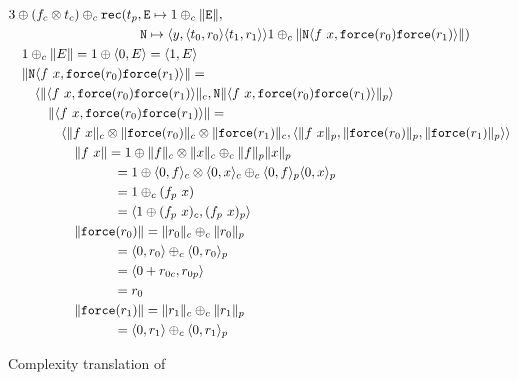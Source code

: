 \begin{figure}
  \label{fig:ws_treemap_complexity_translation}
  \caption{Complexity translation of }
  \begin{equation*}
    \begin{split}
      &3 \oplus (f_c \otimes t_c) \oplus_c \T{rec}(t_p, \T{E} \mapsto 1 \oplus_c \|\T{E}\|, \\
      &\quadten \T{N} \mapsto \langle y, \langle t_0, r_0 \rangle \langle t_1, r_1 \rangle \rangle 1 \oplus_c \|\T{N}\langle f\ x, \T{force}(r_0) \T{force}(r_1)\rangle \| ) \\
      &\quad 1 \oplus_c \|E\| = 1 \oplus \langle 0, E \rangle = \langle 1, E \rangle \\
      &\quad \|\T{N}\langle f\ x, \T{force}(r_0) \T{force}(r_1)\rangle \| = \\
      &\qquad \langle \|\langle f\ x, \T{force}(r_0) \T{force}(r_1)\rangle \|_c, \T{N} \|\langle f\ x, \T{force}(r_0) \T{force}(r_1)\rangle\|_p\rangle \\
      &\quadthree \|\langle f\ x, \T{force}(r_0) \T{force}(r_1)\rangle \| = \\
      &\quadfour \langle \|f\ x\|_c \otimes \|\T{force}(r_0)\|_c \otimes \|\T{force}(r_1)\|_c, \langle \|f\ x\|_p, \|\T{force}(r_0)\|_p, \|\T{force}(r_1)\|_p \rangle \rangle \\
      &\quadfive  \|f\ x\| = 1 \oplus \|f\|_c \otimes \|x\|_c \oplus_c \|f\|_p \|x\|_p \\
      &\quadeight = 1 \oplus \langle 0, f \rangle_c \otimes \langle 0, x \rangle_c \oplus_c \langle 0, f \rangle_p \langle 0, x \rangle_p \\
      &\quadeight = 1 \oplus_c (f_p\ x) \\
      &\quadeight = \langle 1 \oplus (f_p\ x)_c, (f_p\ x)_p \rangle \\
      &\quadfive \|\T{force}(r_0)\| = \|r_0\|_c \oplus_c \|r_0\|_p \\
      &\quadeight = \langle 0, r_0 \rangle \oplus_c \langle 0, r_0 \rangle_p \\
      &\quadeight = \langle 0 + r_{0c}, r_{0p} \rangle \\
      &\quadeight = r_0 \\
      &\quadfive \|\T{force}(r_1)\| = \|r_1\|_c \oplus_c \|r_1\|_p \\
      &\quadeight = \langle 0, r_1 \rangle \oplus_c \langle 0, r_1 \rangle_p \\

\end{split}
\end{equation*}
\end{figure}
